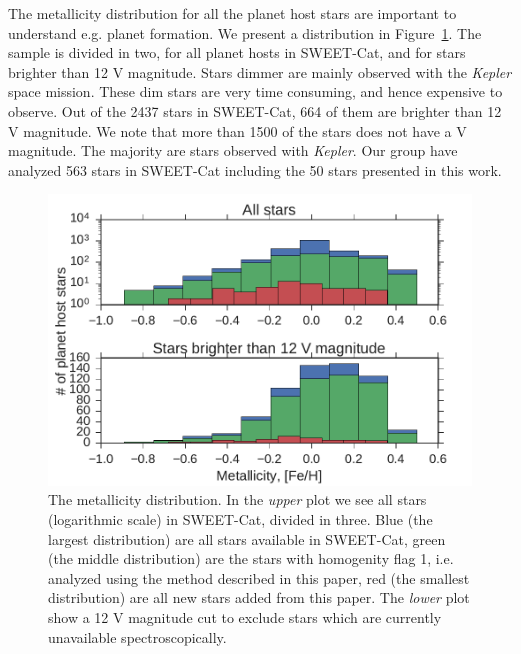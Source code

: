 \documentclass{aa}
\begin{document}
The metallicity distribution for all the planet host stars are important to
understand e.g. planet formation. We present a distribution in
Figure~\ref{fig:distribution}. The sample is divided in two, for all planet
hosts in SWEET-Cat, and for stars brighter than 12 V magnitude. Stars dimmer are
mainly observed with the \emph{Kepler} space mission. These dim stars are very
time consuming, and hence expensive to observe. Out of the 2437 stars in
SWEET-Cat, 664 of them are brighter than 12 V magnitude. We note that more than
1500 of the stars does not have a V magnitude. The majority are stars observed
with \emph{Kepler}. Our group have analyzed 563 stars in SWEET-Cat including the
50 stars presented in this work.


\begin{figure}[tpb]
    \centering
    \includegraphics[width=1.0\linewidth,natwidth=450,natheight=300]{figures/metallicityDistribution.pdf}
    \caption{The metallicity distribution. In the \emph{upper} plot we see all
             stars (logarithmic scale) in SWEET-Cat, divided in three. Blue
             (the largest distribution) are all stars available in SWEET-Cat,
             green (the middle distribution) are the stars with homogenity flag
             1, i.e. analyzed using the method described in this paper, red
             (the smallest distribution) are all new stars added from this
             paper. The \emph{lower} plot show a 12 V magnitude cut to exclude
             stars which are currently unavailable spectroscopically.}
    \label{fig:distribution}
\end{figure}
\end{document}
